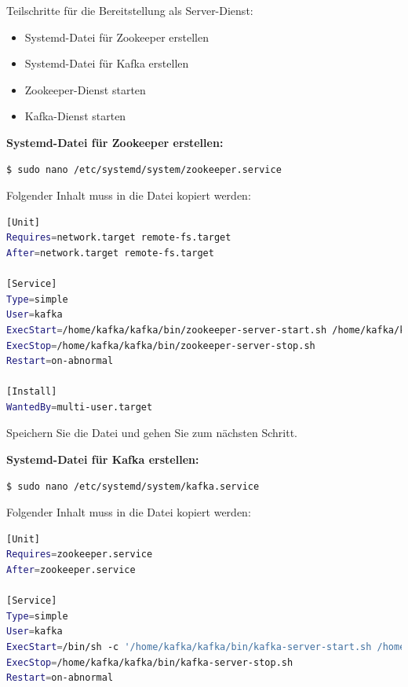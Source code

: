 \documentclass[a4paper,titlepage,halfparskip,12pt]{scrreprt}
\begin{document}
\begin{onehalfspacing}
Teilschritte für die Bereitstellung als Server-Dienst:

\begin{itemize}
\item Systemd-Datei für Zookeeper erstellen
\item Systemd-Datei für Kafka erstellen
\item Zookeeper-Dienst starten
\item Kafka-Dienst starten
\end{itemize}

\bigskip

\textbf{Systemd-Datei für Zookeeper erstellen:}

\bigskip

\begin{lstlisting}[language=Bash]
$ sudo nano /etc/systemd/system/zookeeper.service
\end{lstlisting}

Folgender Inhalt muss in die Datei kopiert werden:

\smallskip

\begin{lstlisting}[language=Bash]
[Unit]
Requires=network.target remote-fs.target
After=network.target remote-fs.target

[Service]
Type=simple
User=kafka
ExecStart=/home/kafka/kafka/bin/zookeeper-server-start.sh /home/kafka/kafka/config/zookeeper.properties
ExecStop=/home/kafka/kafka/bin/zookeeper-server-stop.sh
Restart=on-abnormal

[Install]
WantedBy=multi-user.target
\end{lstlisting}

Speichern Sie die Datei und gehen Sie zum nächsten Schritt.

\textbf{Systemd-Datei für Kafka erstellen:}

\bigskip

\begin{lstlisting}[language=Bash]
$ sudo nano /etc/systemd/system/kafka.service
\end{lstlisting}

Folgender Inhalt muss in die Datei kopiert werden:

\smallskip

\begin{lstlisting}[language=Bash]
[Unit]
Requires=zookeeper.service
After=zookeeper.service

[Service]
Type=simple
User=kafka
ExecStart=/bin/sh -c '/home/kafka/kafka/bin/kafka-server-start.sh /home/kafka/kafka/config/server.properties > /home/kafka/kafka/kafka.log 2>&1'
ExecStop=/home/kafka/kafka/bin/kafka-server-stop.sh
Restart=on-abnormal


\end{lstlisting}
\end{onehalfspacing}
\end{document}
